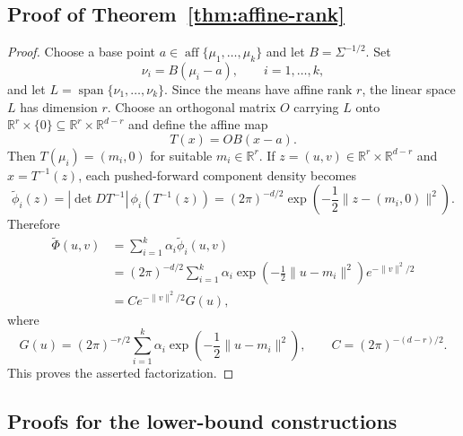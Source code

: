 \documentclass[11pt]{article}
\theoremstyle{plain}
\theoremstyle{definition}
\theoremstyle{remark}
\numberwithin{equation}{section}
\DeclareMathOperator{\aff}{aff}
\newcommand{\R}{\mathbb{R}}
\begin{document}
\subsection{Proof of Theorem~\ref{thm:affine-rank}}\label{subsec:affine-rank-proof}

\begin{proof}
Choose a base point $a\in \aff\{\mu_1,\dots,\mu_k\}$ and let $B=\Sigma^{-1/2}$. Set
\[
\nu_i=B(\mu_i-a),\qquad i=1,\dots,k,
\]
and let $L=\operatorname{span}\{\nu_1,\dots,\nu_k\}$. Since the means have affine rank $r$, the linear space $L$ has dimension $r$. Choose an orthogonal matrix $O$ carrying $L$ onto $\R^r\times\{0\}\subseteq \R^r\times\R^{d-r}$ and define the affine map
\[
T(x)=OB(x-a).
\]
Then $T(\mu_i)=(m_i,0)$ for suitable $m_i\in\R^r$. If $z=(u,v)\in\R^r\times\R^{d-r}$ and $x=T^{-1}(z)$, each pushed-forward component density becomes
\[
\widetilde\phi_i(z)=|\det DT^{-1}|\,\phi_i(T^{-1}(z))
=(2\pi)^{-d/2}\exp\!\left(-\frac12\|z-(m_i,0)\|^2\right).
\]
Therefore
\begin{align*}
\widetilde\Phi(u,v)
&=\sum_{i=1}^k \alpha_i\widetilde\phi_i(u,v) \\
&=(2\pi)^{-d/2}\sum_{i=1}^k \alpha_i\exp\!\left(-\frac12\|u-m_i\|^2\right)e^{-\|v\|^2/2} \\
&=C e^{-\|v\|^2/2}G(u),
\end{align*}
where
\[
G(u)=(2\pi)^{-r/2}\sum_{i=1}^k \alpha_i\exp\!\left(-\frac12\|u-m_i\|^2\right),
\qquad
C=(2\pi)^{-(d-r)/2}.
\]
This proves the asserted factorization.
\end{proof}

\subsection{Proofs for the lower-bound constructions}\label{subsec:lower-bound-proofs}
\end{document}

